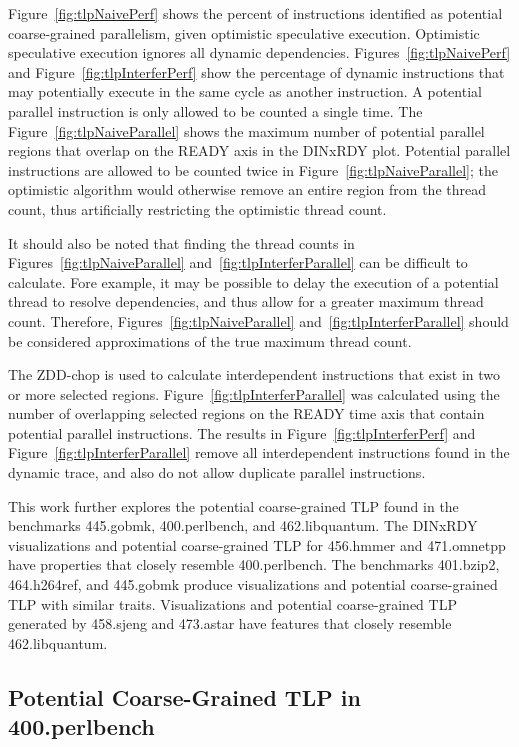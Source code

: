 {Figure~\ref{fig:tlpNaivePerf} shows the percent of instructions identified as potential coarse-grained parallelism, given optimistic speculative execution. Optimistic speculative execution ignores all dynamic dependencies. Figures~\ref{fig:tlpNaivePerf} and Figure~\ref{fig:tlpInterferPerf} show the percentage of dynamic instructions that may potentially execute in the same cycle as another instruction.  A potential parallel instruction is only allowed to be counted a single time. The Figure~\ref{fig:tlpNaiveParallel} shows the maximum number of potential parallel regions that overlap on the READY axis in the DINxRDY plot. Potential parallel instructions are allowed to be counted twice in Figure~\ref{fig:tlpNaiveParallel}; the optimistic algorithm would otherwise remove an entire region from the thread count, thus artificially restricting the optimistic thread count.

It should also be noted that finding the thread counts in Figures~\ref{fig:tlpNaiveParallel} and~\ref{fig:tlpInterferParallel} can be difficult to calculate.  Fore example, it may be possible to delay the execution of a potential thread to resolve dependencies, and thus allow for a greater maximum thread count.  Therefore, Figures~\ref{fig:tlpNaiveParallel} and~\ref{fig:tlpInterferParallel} should be considered approximations of the true maximum thread count.

The ZDD-chop is used to calculate interdependent instructions that exist in two or more selected regions. Figure~\ref{fig:tlpInterferParallel} was calculated using the number of overlapping selected regions on the READY time axis that contain potential parallel instructions. The results in Figure~\ref{fig:tlpInterferPerf} and Figure~\ref{fig:tlpInterferParallel} remove all interdependent instructions found in the dynamic trace, and also do not allow duplicate parallel instructions.

This work further explores the potential coarse-grained TLP found in the benchmarks 445.gobmk, 400.perlbench, and 462.libquantum.  The DINxRDY visualizations and potential coarse-grained TLP for 456.hmmer and 471.omnetpp have properties that closely resemble 400.perlbench. The benchmarks 401.bzip2, 464.h264ref, and 445.gobmk produce visualizations and potential coarse-grained TLP with similar traits. Visualizations and potential coarse-grained TLP generated by 458.sjeng and 473.astar have features that closely resemble 462.libquantum.

\subsection{Potential Coarse-Grained TLP in 400.perlbench}

}
